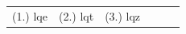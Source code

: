  \par \begin{tabular}[h]{cccccc}
 (1.) lqe  &  (2.) lqt  &  (3.) lqz  & \end{tabular}
%     
%     
%     
%     
%     
    \label{m39373*cid5}
